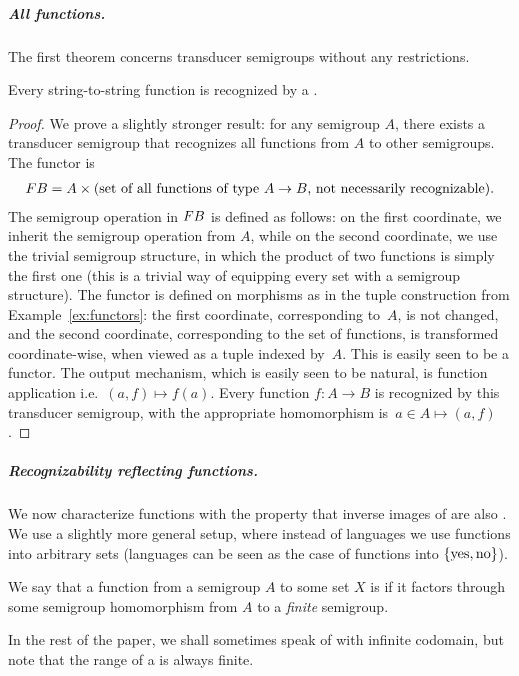 \subparagraph{All functions.} The first theorem concerns transducer semigroups without any restrictions.

\begin{theorem}\label{thm:all-functions} 
 Every string-to-string function is recognized by a .
\end{theorem}
\begin{proof}
 We prove a slightly stronger result: for any semigroup $A$, there exists a transducer semigroup that recognizes all functions from $A$ to other semigroups. The functor is 
 \begin{align*}
 \functor B = A \times \text{(set of all functions of type $A \to B$, not necessarily recognizable)}.
 \end{align*}
 \AP The semigroup operation in $\functor B$ is defined as follows: on the first coordinate, we inherit the semigroup operation from $A$, while on the second coordinate, we use the trivial  semigroup structure, in which  the product of two functions is simply the first one (this is a trivial way of equipping every set with a semigroup structure). The functor is defined on morphisms
as in the tuple construction from Example~\ref{ex:functors}: the first coordinate, corresponding to~$A$, is not changed, and the second coordinate, corresponding to the set of functions, is transformed coordinate-wise, when viewed as a tuple indexed by~$A$. This is easily seen to be a functor. The output mechanism, which is easily seen to be natural, is function application i.e.~$(a,f) \mapsto f(a)$.
Every function $f\colon A \to B$ is recognized by this transducer semigroup, with the appropriate homomorphism is~$a \in A \mapsto (a,f)$.
\end{proof}

\subparagraph{Recognizability reflecting functions.} We now characterize
functions with the property that inverse images of  are
also . We use a slightly more general setup, where instead of
languages we use functions into arbitrary sets (languages can be seen as the
case of functions into $\{\text{yes},\text{no}\}$).

\begin{definition}
  We say that a function from a semigroup $A$ to some set $X$ is
   if it factors through some semigroup homomorphism from $A$
  to a \emph{finite} semigroup.
\end{definition}
In the rest of the paper, we shall sometimes
speak of  with infinite codomain, but note that the
range of a  is always finite.

